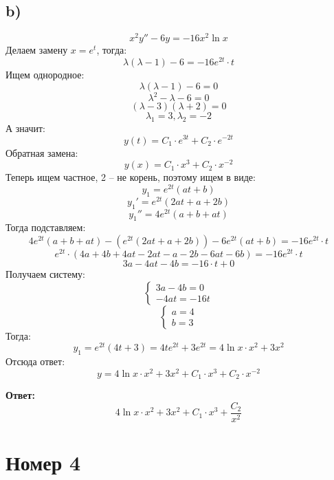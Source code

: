 \documentclass[a4paper,12pt]{article}
\begin{document}
\subsection*{b)}
\[
x^2y'' - 6y = -16x^2 \ln x
\]
Делаем замену $x = e^t$, тогда:
\[
\lambda(\lambda - 1) - 6 = -16 e^{2t} \cdot t
\]
Ищем однородное:
\[
\lambda(\lambda - 1) - 6  = 0
\]
\[
\lambda^2 - \lambda -6 = 0
\]
\[
(\lambda - 3)(\lambda + 2) = 0
\]
\[
\lambda_1 = 3, \lambda_2 = -2 
\]
А значит:
\[
y(t) = C_1 \cdot e^{3t} + C_2 \cdot e^{-2t} 
\]
Обратная замена:
\[
y(x) =  C_1 \cdot x^{3} + C_2 \cdot x^{-2} 
\]
Теперь ищем частное, 2 -- не корень, поэтому ищем в виде:
\[
y_1 = e^{2t} (at + b)
\]
\[
y_1' = e^{2t} (2at + a + 2b)
\]
\[
y_1'' = 4 e^{2t} (a + b + a t)
\]
Тогда подставляем:
\[
4 e^{2t} (a + b + a t) - (e^{2t} (2at + a + 2b)) - 6  e^{2t} (at + b) = -16 e^{2t}\cdot  t
\]
\[
e^{2t} \cdot \left(
4a + 4b + 4at -2at - a -2b -6at - 6b
\right)
=-16 e^{2t}\cdot  t
\]
\[
3a - 4at -4b = -16 \cdot  t + 0
\]
Получаем систему:
\[
\begin{cases}
3a -4b = 0 \\
-4at = -16t
\end{cases}
\]
\[
\begin{cases}
a = 4 \\
b = 3
\end{cases}
\]
Тогда:
\[
y_1 = e^{2t}(4t + 3) = 4te^{2t} + 3e^{2t} = 4 \ln x \cdot x^2 + 3x^2
\]
Отсюда ответ:
\[
y = 4 \ln x \cdot x^2 + 3x^2 + C_1 \cdot x^{3} + C_2 \cdot x^{-2} 
\]
\begin{center}
\textbf{Ответ: } 
\[
4 \ln x \cdot x^2 + 3x^2 + C_1 \cdot x^{3} + \frac{C_2}{x^2}
\]
\end{center}
\clearpage
\section*{Номер 4}
\end{document}
